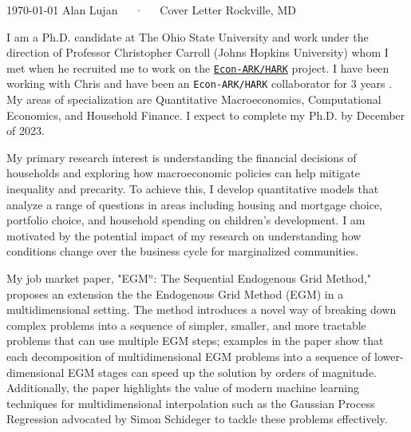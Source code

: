 \documentclass[11pt, letterpaper]{awesome-cv}
\begin{document}
\makecvheader[R]

\makecvfooter
 {\today}
 {Alan Lujan~~~·~~~Cover Letter}
 {Rockville, MD}

\makelettertitle

\begin{cvletter}


I am a Ph.D. candidate at The Ohio State University and work under the direction of Professor Christopher Carroll (Johns Hopkins University) whom I met when he recruited me to work on the \href{https://github.com/econ-ark/HARK}{\texttt{Econ-ARK/HARK}} project. I have been working with Chris and have been an \texttt{Econ-ARK/HARK} collaborator for 3 years . My areas of specialization are Quantitative Macroeconomics, Computational Economics, and Household Finance. I expect to complete my Ph.D. by December of 2023.

My primary research interest is understanding the financial decisions of households and exploring how macroeconomic policies can help mitigate inequality and precarity. To achieve this, I develop quantitative models that analyze a range of questions in areas including housing and mortgage choice, portfolio choice, and household spending on children's development. I am motivated by the potential impact of my research on understanding how conditions change over the business cycle for marginalized communities.

My job market paper, "EGM$^n$: The Sequential Endogenous Grid Method," proposes an extension the the Endogenous Grid Method (EGM) in a multidimensional setting. The method introduces a novel way of breaking down complex problems into a sequence of simpler, smaller, and more tractable problems that can use multiple EGM steps; examples in the paper show that each decomposition of multidimensional EGM problems into a sequence of lower-dimensional EGM stages can speed up the solution by orders of magnitude. Additionally, the paper highlights the value of modern machine learning techniques for multidimensional interpolation such as the Gaussian Process Regression advocated by Simon Schideger to tackle these problems effectively.


\end{cvletter}
\end{document}

